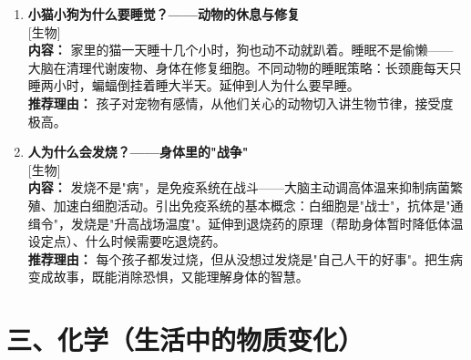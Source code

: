 \documentclass[a4paper,12pt]{ctexart}
\newcommand{\tagbiology}{\textcolor{biology}{\small [生物]}}
\begin{document}
\begin{enumerate}
\item[\textbf{第9课}] \textbf{小猫小狗为什么要睡觉？——动物的休息与修复} \\
\tagbiology \\
\textbf{内容：} 家里的猫一天睡十几个小时，狗也动不动就趴着。睡眠不是偷懒——大脑在清理代谢废物、身体在修复细胞。不同动物的睡眠策略：长颈鹿每天只睡两小时，蝙蝠倒挂着睡大半天。延伸到人为什么要早睡。\\
\textbf{推荐理由：} 孩子对宠物有感情，从他们关心的动物切入讲生物节律，接受度极高。

\item[\textbf{第10课}] \textbf{人为什么会发烧？——身体里的"战争"} \\
\tagbiology \\
\textbf{内容：} 发烧不是"病"，是免疫系统在战斗——大脑主动调高体温来抑制病菌繁殖、加速白细胞活动。引出免疫系统的基本概念：白细胞是"战士"，抗体是"通缉令"，发烧是"升高战场温度"。延伸到退烧药的原理（帮助身体暂时降低体温设定点）、什么时候需要吃退烧药。\\
\textbf{推荐理由：} 每个孩子都发过烧，但从没想过发烧是"自己人干的好事"。把生病变成故事，既能消除恐惧，又能理解身体的智慧。

\end{enumerate}

\section*{\textcolor{orange!80!black}{三、化学（生活中的物质变化）}}
\end{document}
